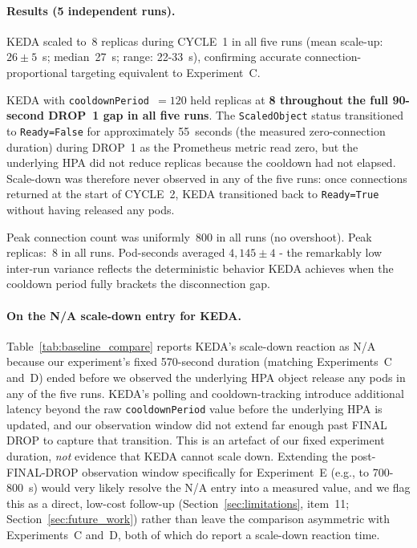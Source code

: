 \documentclass[3p,twocolumn]{elsarticle}
\theoremstyle{plain}%
\theoremstyle{definition}%
\begin{document}
\paragraph{Results (5 independent runs).} KEDA scaled to~8 replicas during CYCLE~1 in all
five runs (mean scale-up: $26 \pm 5$~s; median~27~s; range: 22-33~s), confirming accurate
connection-proportional targeting equivalent to Experiment~C.

KEDA with \texttt{cooldownPeriod}~$= 120$ held replicas at \textbf{8 throughout the full
90-second DROP~1 gap in all five runs}. The \texttt{ScaledObject} status transitioned to
\texttt{Ready=False} for approximately 55~seconds (the measured zero-connection duration) during DROP~1 as the Prometheus metric
read zero, but the underlying HPA did not reduce replicas because the cooldown had not
elapsed. Scale-down was therefore never observed in any of the five runs: once connections
returned at the start of CYCLE~2, KEDA transitioned back to \texttt{Ready=True} without
having released any pods.

Peak connection count was uniformly~800 in all runs (no overshoot). Peak replicas:~8 in all
runs. Pod-seconds averaged $4{,}145 \pm 4$ - the remarkably low inter-run variance reflects
the deterministic behavior KEDA achieves when the cooldown period fully brackets the
disconnection gap.

\paragraph{On the N/A scale-down entry for KEDA.}
Table~\ref{tab:baseline_compare} reports KEDA's scale-down reaction as N/A because our
experiment's fixed 570-second duration (matching Experiments~C and~D) ended before we
observed the underlying HPA object release any pods in any of the five runs. KEDA's
polling and cooldown-tracking introduce additional latency beyond the raw
\texttt{cooldownPeriod} value before the underlying HPA is updated, and our observation
window did not extend far enough past FINAL DROP to capture that transition. This is an
artefact of our fixed experiment duration, \textit{not} evidence that KEDA cannot scale
down. Extending the post-FINAL-DROP observation window specifically for Experiment~E
(e.g., to 700-800~s) would very likely resolve the N/A entry into a measured value, and we
flag this as a direct, low-cost follow-up (Section~\ref{sec:limitations}, item~11;
Section~\ref{sec:future_work}) rather than leave the comparison asymmetric with
Experiments~C and~D, both of which do report a scale-down reaction time.
\end{document}
